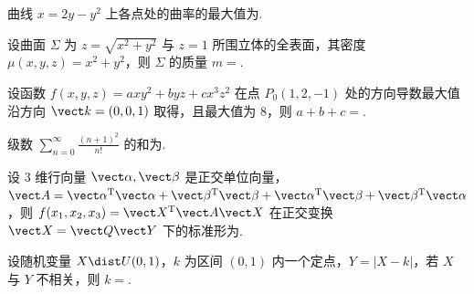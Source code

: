 \begin{question}[index=11]
曲线 $x=2y-y^2$ 上各点处的曲率的最大值为\fillin.
\end{question}
\QuestionBreak

\begin{question}[index=12]
设曲面 $\Sigma$ 为 $z=\sqrt{x^2+y^2}$ 与 $z=1$ 所围立体的全表面，其密度 $\mu(x,y,z)=x^2+y^2$，则 $\Sigma$ 的质量 $m=$\fillin.
\end{question}
\QuestionBreak

\begin{question}[index=13]
设函数 $f(x,y,z)=axy^2+byz+cx^3z^2$ 在点 $P_0(1,2,-1)$ 处的方向导数最大值沿方向 $\vect k=(0,0,1)$ 取得，且最大值为 $8$，则 $a+b+c=$\fillin.
\end{question}
\QuestionBreak

\begin{question}[index=14]
级数 $\displaystyle\sum_{n=0}^\infty\frac{(n+1)^2}{n!}$ 的和为\fillin.
\end{question}
\QuestionBreak

\begin{question}[index=15]
设 $3$ 维行向量 $\vect\alpha,\vect\beta$ 是正交单位向量，$\vect A=\vect\alpha^{\mathrm T}\vect\alpha+\vect\beta^{\mathrm T}\vect\beta+\vect\alpha^{\mathrm T}\vect\beta+\vect\beta^{\mathrm T}\vect\alpha$，则 $f(x_1,x_2,x_3)=\vect X^{\mathrm T}\vect A\vect X$ 在正交变换 $\vect X=\vect Q\vect Y$ 下的标准形为\fillin.
\end{question}
\QuestionBreak

\begin{question}[index=16]
设随机变量 $X\dist U(0,1)$，$k$ 为区间 $(0,1)$ 内一个定点，$Y=|X-k|$，若 $X$ 与 $Y$ 不相关，则 $k=$\fillin.
\end{question}
